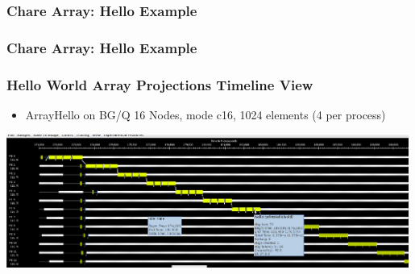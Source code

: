 \begin{frame}[fragile]
  \frametitle{Chare Array: Hello Example }
  
\end{frame}

\begin{frame}[fragile]
  \frametitle{Chare Array: Hello Example }
  
\end{frame}

\begin{frame}[fragile]
   \frametitle{Hello World Array Projections Timeline View}\scriptsize
  \begin{itemize}
    \item ArrayHello on BG/Q 16 Nodes, mode c16, 1024 elements (4 per process)
  \end{itemize}
  \begin{center} \includegraphics[width=0.99\textwidth]{figures/arrayHelloTimeline} \end{center}
\end{frame}


